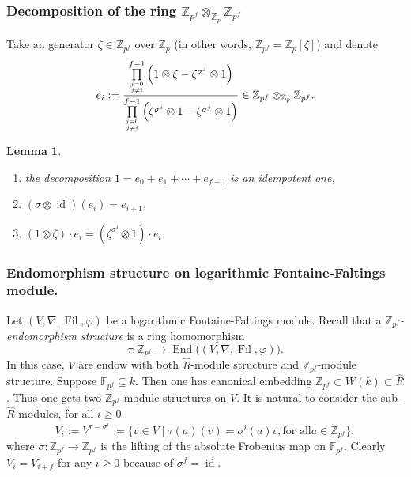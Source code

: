 \documentclass[12pt,twoside]{book}
\theoremstyle{plain}
\newtheorem{lemma}[lemma]{Lemma}
\theoremstyle{definition}
\theoremstyle{remark}
\newcommand{\bF}{{\mathbb F}}
\newcommand{\bZ}{{\mathbb Z}}
\DeclareMathOperator\End{End}
\DeclareMathOperator\Fil{Fil}
\DeclareMathOperator\id{id}
\numberwithin{equation}{section}
\begin{document}
\subsubsection{Decomposition of the ring $\bZ_{p^f}\otimes_{\bZ_p} \bZ_{p^f}$}

Take an generator $\zeta\in \bZ_{p^f}$ over $\bZ_p$ (in other words, $\bZ_{p^f}=\bZ_{p}[\zeta]$) and denote
\begin{equation}
e_i:= \frac{\prod\limits_{j=0\atop j\neq i}^{f-1}\Big(1\otimes\zeta-\zeta^{\sigma^j}\otimes 1\Big)}{\prod\limits_{j=0\atop j\neq i}^{f-1}\Big(\zeta^{\sigma^i}\otimes 1-\zeta^{\sigma^j}\otimes 1\Big)} \in \bZ_{p^f}\otimes_{\bZ_p} \bZ_{p^f}.
\end{equation}

\begin{lemma}
\begin{enumerate}
\item[$(1)$] the decomposition $1=e_0+e_1+\cdots+e_{f-1}$ is an idempotent one,
\item[$(2)$] $(\sigma\otimes\id)(e_i) = e_{i+1}$,
\item[$(3)$] $(1\otimes\zeta)\cdot e_i = (\zeta^{\sigma^i}\otimes1)\cdot e_i$.
\end{enumerate}
\end{lemma}

\subsubsection{Endomorphism structure on logarithmic Fontaine-Faltings module.}

Let $(V,\nabla,\Fil,\varphi)$ be a logarithmic Fontaine-Faltings module. Recall that a
\emph{$\bZ_{p^f}$-endomorphism structure} is a ring homomorphism
\[\tau\colon \bZ_{p^f} \rightarrow \End\big((V,\nabla,\Fil,\varphi)\big).\]
In this case, $V$ are endow with both $\widehat{R}$-module structure and $\bZ_{p^f}$-module structure. Suppose $\bF_{p^f}\subseteq k$. Then one has canonical embedding $\bZ_{p^f}\subset W(k) \subset \widehat{R}$. Thus one gets two $\bZ_{p^f}$-module structures on $V$. It is natural to consider the sub-$\widehat{R}$-modules, for all $i\geq0$
\[V_i:=V^{\tau=\sigma^i} := \{v\in V\mid \tau(a)(v) = \sigma^{i}(a)v,\text{for all} a\in \bZ_{p^f}\},\]
where $\sigma\colon \bZ_{p^f}\rightarrow \bZ_{p^f}$ is the lifting of the absolute Frobenius map on $\bF_{p^f}$. Clearly $V_{i}=V_{i+f}$ for any $i\geq0$ because of $\sigma^f=\id$.
\end{document}
